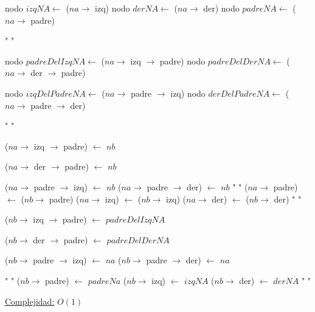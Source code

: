 \begin{Algoritmos}
\begin{algorithm}[H]
\begin{algorithmic}[1]
    \State nodo $izqNA \gets$ ($na \to$ izq)
    \State nodo $derNA \gets$ ($na \to$ der)
    \State nodo $padreNA \gets$ ($na \to$ padre)

    \State " "

        \State nodo $padreDelIzqNA \gets$ ($na \to$ izq $\to$ padre)
    \EndIf
        \State nodo $padreDelDerNA \gets$ ($na \to$ der $\to$ padre)
    \EndIf

        \State nodo $izqDelPadreNA \gets$ ($na \to$ padre $\to$ izq)
    \EndIf
        \State nodo $derDelPadreNA \gets$ ($na \to$ padre $\to$ der)
    \EndIf

    \State " "


        \State ($na \to$ izq $\to$ padre) $\gets$ $nb$
    \EndIf

        \State ($na \to$ der $\to$ padre) $\gets$ $nb$
    \EndIf

        \State ($na \to$ padre $\to$ izq) $\gets$ $nb$
    \EndIf
        \State ($na \to$ padre $\to$ der) $\gets$ $nb$
    \EndIf
    \State " "
    \State ($na \to$ padre) $\gets$ ($nb \to$ padre)
    \State ($na \to$ izq) $\gets$ ($nb \to$ izq)
    \State ($na \to$ der) $\gets$ ($nb \to$ der)
    \State " "


        \State ($nb \to$ izq $\to$ padre) $\gets$ $padreDelIzqNA$
    \EndIf

        \State ($nb \to$ der $\to$ padre) $\gets$ $padreDelDerNA$
    \EndIf

        \State ($nb \to$ padre $\to$ izq) $\gets$ $na$
    \EndIf
        \State ($nb \to$ padre $\to$ der) $\gets$ $na$
    \EndIf





    \State " "
    \State ($nb \to$ padre) $\gets$ $padreNa$
    \State ($nb \to$ izq) $\gets$ $izqNA$
    \State ($nb \to$ der) $\gets$ $derNA$
    \State " "



    \medskip
    \Statex \underline{Complejidad:} $O(1)$

\end{algorithmic}
\end{algorithm}





\end{Algoritmos}
